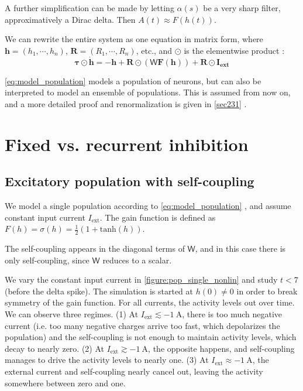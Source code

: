 \documentclass[10pt,conference,compsocconf,a4paper]{IEEEtran}
\renewcommand{\vec}[1]{\boldsymbol{#1}}
\newcommand{\nunit}[1]{\ \si{#1}}
\newcommand*{\shortautoref}[1]{%
	\begingroup
	\def\equationautorefname{\textsc{Eq.}}%
	\def\tableautorefname{\textsc{Tab.}}%
	\def\figureautorefname{\textsc{Fig.}}%
	\autoref{#1}%
	\endgroup
}
\begin{document}
	A further simplification can be made by letting $\alpha(s)$ be a very sharp filter, approximatively a Dirac delta. Then $A(t) \approx F(h(t))$.

	We can rewrite the entire system as one equation in matrix form, where $\vec h = (h_1, \cdots, h_n)$, $\vec R = (R_1, \cdots, R_n)$, etc., and $\odot$ is the elementwise product :
\
	\begin{equation} \label{eq:model_population}
		\vec{\tau} \odot \dot{\vec h} = -\vec h + \vec R \odot (\mathsf W \vec F(\vec h)) + \vec R \odot \vec{I_{\text{ext}}}
	\end{equation}

	\shortautoref{eq:model_population} models a population of neurons, but can also be interpreted to model an ensemble of populations. This is assumed from now on, and a more detailed proof and renormalization is given in \shortautoref{sec231}.

\section{Fixed vs. recurrent inhibition}
\label{sec1}

	\subsection{Excitatory population with self-coupling}
	\label{sec11}

		We model a single population according to \shortautoref{eq:model_population}, and assume constant input current $I_{\text{ext}}$. The gain function is defined as $F(h) = \sigma(h) = \frac 12 (1 + \mathrm{tanh}(h))$.
		
		The self-coupling appears in the diagonal terms of $\mathsf W$, and in this case there is only self-coupling, since $\mathsf W$ reduces to a scalar.

		We vary the constant input current in \shortautoref{figure:pop_single_nonlin} and study $t < 7$ (before the delta spike). The simulation is started at $h(0) \neq 0$ in order to break symmetry of the gain function. For all currents, the activity levels out over time. We can observe three regimes.
		(1) At $I_{\text{ext}} \lesssim -1 \nunit{\ampere}$, there is too much negative current (i.e. too many negative charges arrive too fast, which depolarizes the population) and the self-coupling is not enough to maintain activity levels, which decay to nearly zero.
		(2) At $I_{\text{ext}} \gtrsim -1 \nunit{\ampere}$, the opposite happens, and self-coupling manages to drive the activity levels to nearly one.
		(3) At $I_{\text{ext}} \approx -1 \nunit{\ampere}$, the external current and self-coupling nearly cancel out, leaving the activity somewhere between zero and one.
\end{document}
